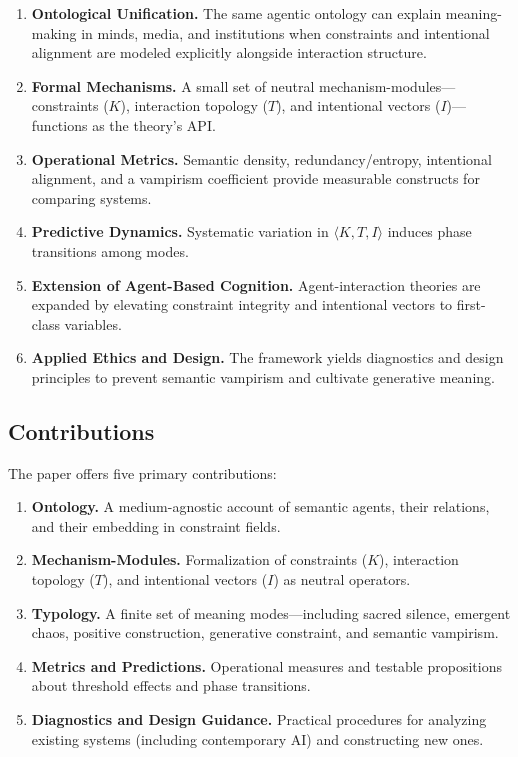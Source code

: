 \documentclass[12pt]{article}
\begin{document}
\begin{enumerate}
\item \textbf{Ontological Unification.} The same agentic ontology can explain meaning-making in minds, media, and institutions when constraints and intentional alignment are modeled explicitly alongside interaction structure.

\item \textbf{Formal Mechanisms.} A small set of neutral mechanism-modules—constraints ($K$), interaction topology ($T$), and intentional vectors ($I$)—functions as the theory's API.

\item \textbf{Operational Metrics.} Semantic density, redundancy/entropy, intentional alignment, and a vampirism coefficient provide measurable constructs for comparing systems.

\item \textbf{Predictive Dynamics.} Systematic variation in $\langle K, T, I \rangle$ induces phase transitions among modes.

\item \textbf{Extension of Agent-Based Cognition.} Agent-interaction theories are expanded by elevating constraint integrity and intentional vectors to first-class variables.

\item \textbf{Applied Ethics and Design.} The framework yields diagnostics and design principles to prevent semantic vampirism and cultivate generative meaning.
\end{enumerate}

\subsection{Contributions}

The paper offers five primary contributions:

\begin{enumerate}
\item \textbf{Ontology.} A medium-agnostic account of semantic agents, their relations, and their embedding in constraint fields.

\item \textbf{Mechanism-Modules.} Formalization of constraints ($K$), interaction topology ($T$), and intentional vectors ($I$) as neutral operators.

\item \textbf{Typology.} A finite set of meaning modes—including sacred silence, emergent chaos, positive construction, generative constraint, and semantic vampirism.

\item \textbf{Metrics and Predictions.} Operational measures and testable propositions about threshold effects and phase transitions.

\item \textbf{Diagnostics and Design Guidance.} Practical procedures for analyzing existing systems (including contemporary AI) and constructing new ones.
\end{enumerate}
\end{document}
